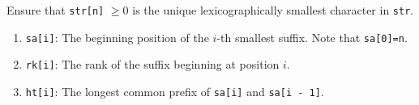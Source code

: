 Ensure that \texttt{str[n]} $\geq 0$ is the unique lexicographically smallest character in \texttt{str}.

\begin{enumerate}
\item \texttt{sa[i]}: The beginning position of the $i$-th smallest suffix. Note that \texttt{sa[0]=n}.
\item \texttt{rk[i]}: The rank of the suffix beginning at position $i$.
\item \texttt{ht[i]}: The longest common prefix of \texttt{sa[i]} and \texttt{sa[i - 1]}.
\end{enumerate}


